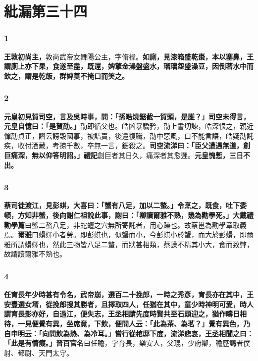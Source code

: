 \chapter{紕漏第三十四}

\subsection*{1}

\textbf{王敦初尚主，}{\footnotesize 敦尚武帝女舞陽公主，字脩褘。}\textbf{如廁，見漆箱盛乾棗，本以塞鼻，王謂廁上亦下果，食遂至盡，既還，婢擎金澡盤盛水，瑠璃盌盛澡豆，因倒著水中而飲之，謂是乾飯，群婢莫不掩口而笑之。}

\subsection*{2}

\textbf{元皇初見賀司空，言及吳時事，問：「孫皓燒鋸截一賀頭，是誰？」司空未得言，元皇自憶曰：「是賀劭。」}{\footnotesize 劭即循父也。皓凶暴驕矜，劭上書切諫，皓深恨之，親近憚劭貞正，譖云謗毀國事，被詰責，後還復職，劭中惡風，口不能言語，皓疑劭託疾，收付酒藏，考掠千數，卒無一言，鋸殺之。}\textbf{司空流涕曰：「臣父遭遇無道，創巨痛深，無以仰答明詔。」}{\footnotesize \textbf{禮記}創巨者其日久，痛深者其愈遲。}\textbf{元皇愧慙，三日不出。}

\subsection*{3}

\textbf{蔡司徒渡江，見彭蜞，大喜曰：「蟹有八足，加以二螯。」令烹之，既食，吐下委頓，方知非蟹，後向謝仁祖說此事，謝曰：「卿讀爾雅不熟，幾為勸學死。」}{\footnotesize \textbf{大戴禮勸學篇}曰蟹二螯八足，非蛇蟺之穴無所寄託者，用心躁也。故蔡邕為勸學章取義焉。\textbf{爾雅}曰螖蠌小者勞。即彭蜞也，似蟹而小，今彭蜞小於蟹，而大於彭螖，即爾雅所謂螖蠌也，然此三物皆八足二螯，而狀甚相類，蔡謨不精其小大，食而致弊，故謂讀爾雅不熟也。}

\subsection*{4}

\textbf{任育長年少時甚有令名，武帝崩，選百二十挽郎，一時之秀彥，育長亦在其中，王安豐選女壻，從挽郎搜其勝者，且擇取四人，任猶在其中，童少時神明可愛，時人謂育長影亦好，自過江，便失志，王丞相請先度時賢共至石頭迎之，猶作疇日相待，一見便覺有異，坐席竟，下飲，便問人云：「此為茶、為茗？」覺有異色，乃自申明云：「向問飲為熱、為冷耳。」嘗行從棺邸下度，流涕悲哀，王丞相聞之曰：「此是有情癡。」}{\footnotesize \textbf{晉百官名}曰任瞻，字育長，樂安人，父琨，少府卿，瞻歷謁者僕射、都尉、天門太守。}

